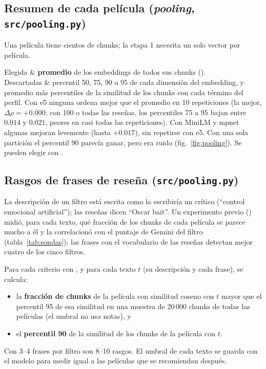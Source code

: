 \documentclass[11pt,a4paper]{article}
\makeatletter
\newenvironment{decision}[1]{\par\smallskip\noindent\tabularx{\linewidth}{@{}>{\bfseries\raggedright}p{2.9cm} >{\raggedright\arraybackslash}X@{}}\toprule}{\bottomrule\endtabularx\par\medskip}
\makeatother
\begin{document}
\subsection{Resumen de cada película (\emph{pooling}, \texttt{src/pooling.py})}

Una película tiene cientos de chunks; la etapa 1 necesita un solo vector por película.

\begin{decision}{}
Elegida & \textbf{promedio} de los embeddings de todos sus chunks (). \\
Descartadas & percentil 50, 75, 90 o 95 de cada dimensión del embedding, y promedio más percentiles de la similitud de
los chunks con cada término del perfil. Con e5 ninguna ordena mejor que el promedio en 10 repeticiones (la mejor,
$\Delta\rho=+0.000$; con 100 o todas las reseñas, los percentiles 75 a 95 bajan entre $0.014$ y $0.021$, peores en
casi todas las repeticiones). Con MiniLM y mpnet
algunas mejoran levemente (hasta $+0.017$), sin repetirse con e5. Con una sola partición el percentil 90 parecía ganar,
pero era ruido (fig.~\ref{fig:pooling}). Se pueden elegir con . \\
\end{decision}

\subsection{Rasgos de frases de reseña (\texttt{src/pooling.py})}\label{sec:frases}

La descripción de un filtro está escrita como la escribiría un crítico (``control emocional artificial''); las reseñas
dicen ``Oscar bait''. Un experimento previo () midió, para cada texto, qué
fracción de los chunks de cada película se parece mucho a él y la correlacionó con el puntaje de Gemini del filtro
(tabla~\ref{tab:sondas}): las frases con el vocabulario de las reseñas detectan mejor cuatro de los cinco filtros.

Para cada criterio con , y para cada texto $t$ (su descripción y cada frase), se calcula:
\begin{itemize}
  \item la \textbf{fracción de chunks} de la película con similitud coseno con $t$ mayor que el percentil 95 de esa
  similitud en una muestra de 20\,000 chunks de todas las películas (el umbral no usa notas), y
  \item el \textbf{percentil 90} de la similitud de los chunks de la película con $t$.
\end{itemize}
Con 3--4 frases por filtro son 8--10 rasgos. El umbral de cada texto se guarda con el modelo para medir igual a las
películas que se recomiendan después.
\end{document}

